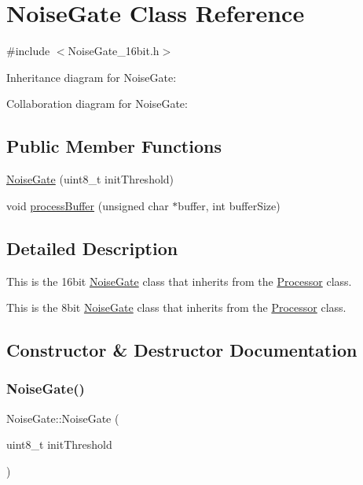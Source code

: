 \hypertarget{classNoiseGate}{}\section{Noise\+Gate Class Reference}
\label{classNoiseGate}


{\ttfamily \#include $<$Noise\+Gate\+\_\+16bit.\+h$>$}



Inheritance diagram for Noise\+Gate\+:


Collaboration diagram for Noise\+Gate\+:
\subsection*{Public Member Functions}
\begin{DoxyCompactItemize}
\item 
\hyperlink{classNoiseGate_a9a5aafbd238dbbc01eff52edd5ef29c4}{Noise\+Gate} (uint8\+\_\+t init\+Threshold)
\item 
void \hyperlink{classNoiseGate_a319f4b7d435ed4a270e695cf7c529d24}{process\+Buffer} (unsigned char $\ast$buffer, int buffer\+Size)
\end{DoxyCompactItemize}


\subsection{Detailed Description}
This is the 16bit \hyperlink{classNoiseGate}{Noise\+Gate} class that inherits from the \hyperlink{classProcessor}{Processor} class.

This is the 8bit \hyperlink{classNoiseGate}{Noise\+Gate} class that inherits from the \hyperlink{classProcessor}{Processor} class. 

\subsection{Constructor \& Destructor Documentation}
\mbox{\label{classNoiseGate_a9a5aafbd238dbbc01eff52edd5ef29c4}} 
\subsubsection{\texorpdfstring{Noise\+Gate()}{NoiseGate()}}
{\footnotesize\ttfamily Noise\+Gate\+::\+Noise\+Gate (\begin{DoxyParamCaption}\item[{uint8\+\_\+t}]{init\+Threshold }\end{DoxyParamCaption})}

